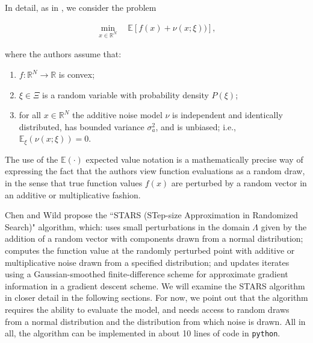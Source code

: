 \documentclass{amsart}
\newcommand{\R}{\mathbb{R}}
\begin{document}


In detail, as in \cite{CW}, we consider the problem

\begin{eqnarray} \label{eq:10}
\min_{x\in\R^N} \quad \mathbb{E}\left[f(x)+\nu (x; \xi))\right],
\end{eqnarray} 

\noindent where the authors assume that:

\begin{enumerate}[(i.)]

\item $f: \R^N \to \R$ is convex;

\item $\xi \in \Xi$ is a random variable with probability density $P(\xi)$;

\item for all $x \in \R^N$ the additive noise model $\nu$ is independent and identically distributed, has bounded variance $\sigma_a^2$, and is unbiased; i.e., $\mathbb{E}_\xi (\nu(x;\xi))=0$.



\end{enumerate}

The use of the $\mathbb{E}(\cdot)$ expected value notation is a mathematically precise way of expressing the fact that the authors view function evaluations as a random draw, in the sense that true function values $f(x)$ are perturbed by a random vector in an additive or multiplicative fashion. 

Chen and Wild propose the ``STARS (STep-size Approximation in Randomized Search)" algorithm, which: uses small perturbations in the domain $\Lambda$ given by the addition of a random vector with components drawn from a normal distribution; computes the function value at the randomly perturbed point with additive or multiplicative noise drawn from a specified distribution; and updates iterates using a Gaussian-smoothed finite-difference scheme for approximate gradient information in a gradient descent scheme. We will examine the STARS algorithm in closer detail in the following sections. For now, we point out that the algorithm requires the ability to evaluate the model, and needs access to random draws from a normal distribution and the distribution from which noise is drawn. All in all, the algorithm can be implemented in about 10 lines of code in \texttt{python}.
\end{document}
